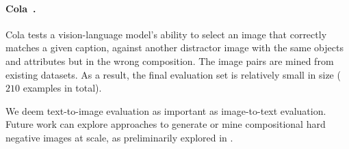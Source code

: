 \paragraph{Cola~\cite{ray2023cola}.} Cola tests a vision-language model's ability to select an image that correctly matches a given caption, against another distractor image with the same objects and attributes but in the wrong composition. The image pairs are mined from existing datasets. As a result, the final evaluation set is relatively small in size ($210$ examples in total).

We deem text-to-image evaluation as important as image-to-text evaluation. Future work can explore approaches to generate or mine compositional hard negative images at scale, as preliminarily explored in \cite{ray2023cola,yuksekgonul2023when}.



\begin{table}[t]
 \caption{Summary on vision-language compositionality benchmarks. \method considers image-to-text formulation to enable larger scale evaluation set. In addition, \method considers a wide range of hard negative types. \shuffle\ and \negate\ are omitted as they introduce inevitable biases discussed in Sec.~\ref{sec:hn_types}.}
 \centering
{}
\label{tab:benchmark_comp}
\end{table}


